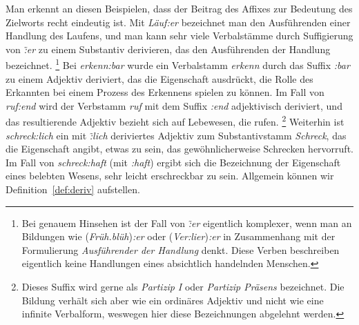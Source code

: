 Man erkennt an diesen Beispielen, dass der Beitrag des Affixes zur Bedeutung des Zielworts recht eindeutig ist.
Mit \textit{Läuf:er} bezeichnet man den Ausführenden einer Handlung des Laufens, und man kann sehr viele Verbalstämme durch Suffigierung von \textit{\~:er} zu einem Substantiv derivieren, das den Ausführenden der Handlung bezeichnet.%
\footnote{Bei genauem Hinsehen ist der Fall von \textit{\~:er} eigentlich komplexer, wenn man an Bildungen wie (\textit{Früh.blüh})\textit{:er} oder (\textit{Ver:lier})\textit{:er} in Zusammenhang mit der Formulierung \textit{Ausführender der Handlung} denkt.
Diese Verben beschreiben eigentlich keine Handlungen eines absichtlich handelnden Menschen.}
Bei \textit{erkenn:bar} wurde ein Verbalstamm \textit{erkenn} durch das Suffix \textit{:bar} zu einem Adjektiv deriviert, das die Eigenschaft ausdrückt, die Rolle des Erkannten bei einem Prozess des Erkennens spielen zu können.
Im Fall von \textit{ruf:end} wird der Verbstamm \textit{ruf} mit dem Suffix \textit{:end} adjektivisch deriviert, und das resultierende Adjektiv bezieht sich auf Lebewesen, die rufen.%
\footnote{Dieses Suffix wird gerne als \textit{Partizip I} oder \textit{Partizip Präsens} bezeichnet.
Die Bildung verhält sich aber wie ein ordinäres Adjektiv und nicht wie eine infinite Verbalform, weswegen hier diese Bezeichnungen abgelehnt werden.}
Weiterhin ist \textit{schreck:lich} ein mit \textit{\~:lich} deriviertes Adjektiv zum Substantivstamm \textit{Schreck}, das die Eigenschaft angibt, etwas zu sein, das gewöhnlicherweise Schrecken hervorruft.
Im Fall von \textit{schreck:haft} (mit \textit{:haft}) ergibt sich die Bezeichnung der Eigenschaft eines belebten Wesens, sehr leicht erschreckbar zu sein.
Allgemein können wir Definition~\ref{def:deriv} aufstellen.


